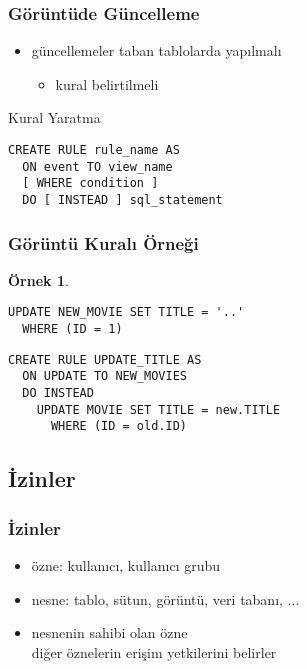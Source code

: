 \documentclass[dvipsnames]{beamer}
\theoremstyle{definition}
\theoremstyle{example}
\newtheorem{ornek}[theorem]{Örnek}
\theoremstyle{plain}
\begin{document}
\begin{frame}[fragile]
  \frametitle{Görüntüde Güncelleme}

  \begin{itemize}
    \item güncellemeler taban tablolarda yapılmalı
    \begin{itemize}
      \item kural belirtilmeli
    \end{itemize}
  \end{itemize}

  \pause
  \begin{block}{Kural Yaratma}
    \begin{lstlisting}
CREATE RULE rule_name AS
  ON event TO view_name
  [ WHERE condition ]
  DO [ INSTEAD ] sql_statement
    \end{lstlisting}
  \end{block}
\end{frame}

\begin{frame}[fragile]
  \frametitle{Görüntü Kuralı Örneği}

  \begin{ornek}
    \begin{lstlisting}
UPDATE NEW_MOVIE SET TITLE = '..'
  WHERE (ID = 1)
    \end{lstlisting}

    \pause
    \begin{lstlisting}
CREATE RULE UPDATE_TITLE AS
  ON UPDATE TO NEW_MOVIES
  DO INSTEAD
    UPDATE MOVIE SET TITLE = new.TITLE
      WHERE (ID = old.ID)
    \end{lstlisting}
  \end{ornek}
\end{frame}

\subsection{İzinler}

\begin{frame}
  \frametitle{İzinler}

  \begin{itemize}
    \item \alert{özne}: kullanıcı, kullanıcı grubu
    \item \alert{nesne}: tablo, sütun, görüntü, veri tabanı, ...

    \pause
    \item nesnenin sahibi olan özne\\
      diğer öznelerin erişim yetkilerini belirler
  \end{itemize}
\end{frame}
\end{document}
